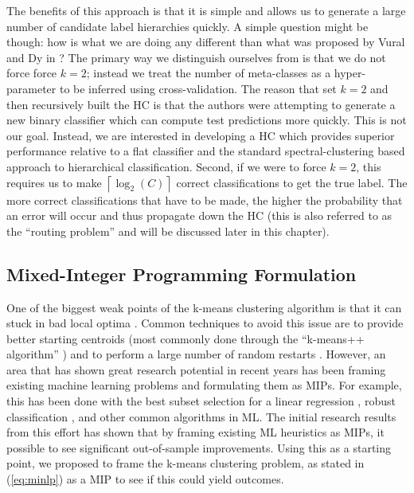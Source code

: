 \documentclass[../thesis.tex]{subfiles}
\begin{document}
The benefits of this approach is that it is simple and allows us to generate a large number of candidate label hierarchies quickly. A simple question might be though: how is what we are doing any different than what was proposed by Vural and Dy in \cite{vural2004hierarchical}? The primary way we distinguish ourselves from \cite{vural2004hierarchical} is that we do not force force $k=2$; instead we treat the number of meta-classes as a hyper-parameter to be inferred using cross-validation. The reason that \cite{vural2004hierarchical} set $k=2$ and then recursively built the HC is that the authors were attempting to generate a new binary classifier which can compute test predictions more quickly. This is not our goal. Instead, we are interested in developing a HC which provides superior performance relative to a flat classifier and the standard spectral-clustering based approach to hierarchical classification. Second, if we were to force $k=2$, this requires us to make $\left \lceil \log_2(C) \right \rceil$ correct classifications to get the true label. The more correct classifications that have to be made, the higher the probability that an error will occur and thus propagate down the HC (this is also referred to as the ``routing problem'' and will be discussed later in this chapter). 

\subsection{Mixed-Integer Programming Formulation}
One of the biggest weak points of the k-means clustering algorithm is that it can stuck in bad local optima \cite{hartigan1979algorithm}. Common techniques to avoid this issue are to provide better starting centroids (most commonly done through the ``k-means++ algorithm'' \cite{arthur2007k}) and to perform a large number of random restarts \cite{dick2014many}. However, an area that has shown great research potential in recent years has been framing existing machine learning problems and formulating them as MIPs.  For example, this has been done with the best subset selection for a linear regression \cite{bertsimas2016best}, robust classification \cite{bertsimas2018robust}, and other common algorithms in ML. The initial research results from this effort has shown that by framing existing ML heuristics as MIPs, it possible to see significant out-of-sample improvements. Using this as a starting point, we proposed to frame the k-means clustering problem, as stated in (\ref{eq:minlp}) as a MIP to see if this could yield outcomes.
\end{document}
